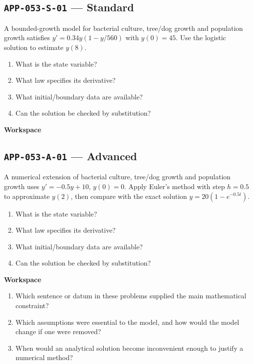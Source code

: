 \documentclass[11pt]{book}
\newcommand{\pid}[1]{\texttt{#1}}
\newcommand{\workspace}{\par\vspace{0.7in}\hrulefill\par\vspace{0.55in}\hrulefill\par}
\begin{document}
\subsection*{\pid{APP-053-S-01} — Standard}
\begin{problembox}
A bounded-growth model for bacterial culture, tree/dog growth and population growth satisfies $y'=0.34y(1-y/560)$ with $y(0)=45$. Use the logistic solution to estimate $y(8)$.
\end{problembox}
\begin{promptbox}\begin{enumerate}
\item What is the state variable?
\item What law specifies its derivative?
\item What initial/boundary data are available?
\item Can the solution be checked by substitution?
\end{enumerate}\end{promptbox}
\textbf{Workspace}\workspace
{}
\subsection*{\pid{APP-053-A-01} — Advanced}
\begin{problembox}
A numerical extension of bacterial culture, tree/dog growth and population growth uses $y'=-0.5y+10$, $y(0)=0$. Apply Euler's method with step $h=0.5$ to approximate $y(2)$, then compare with the exact solution $y=20(1-e^{-0.5t})$.
\end{problembox}
\begin{promptbox}\begin{enumerate}
\item What is the state variable?
\item What law specifies its derivative?
\item What initial/boundary data are available?
\item Can the solution be checked by substitution?
\end{enumerate}\end{promptbox}
\textbf{Workspace}\workspace
\begin{reflectionbox}\begin{enumerate}
\item Which sentence or datum in these problems supplied the main mathematical constraint?
\item Which assumptions were essential to the model, and how would the model change if one were removed?
\item When would an analytical solution become inconvenient enough to justify a numerical method?
\end{enumerate}\end{reflectionbox}
\end{document}
